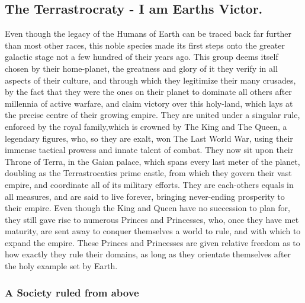 \documentclass[a4paper,12pt]{report}
\begin{document}
\subsection{The Terrastrocraty -  I am Earths Victor.}
Even though the legacy of the Humans of Earth can be traced back far further than most other races, this noble species made its first steps onto the greater galactic stage not a few hundred of their years ago. This group deems itself chosen by their home-planet, the greatness and glory of it they verify in all aspects of their culture, and through which they legitimize their many crusades, by the fact that they were the ones on their planet to dominate all others after millennia of active warfare, and claim victory over this holy-land, which lays at the precise centre of their growing empire. They are united under a singular rule, enforced by the royal family,which is crowned by The King and The Queen, a legendary figures, who, so they are exalt, won The Last World War, using their immense tactical prowess and innate talent of combat. They now sit upon their Throne of Terra, in the Gaian palace, which spans every last meter of the planet, doubling as the Terrastrocaties prime castle, from which they govern their vast empire, and coordinate all of its military efforts. They are each-others equals in all  measures, and are said to live forever, bringing never-ending prosperity to their empire. Even though the King and Queen have no succession to plan for, they still gave rise to numerous Princes and Princesses, who, once they have met maturity, are sent away to conquer themselves a world to rule, and with which to expand the empire. These Princes and Princesses are given relative freedom as to how exactly they rule their domains, as long as they orientate themselves after the holy example set by Earth. \\

\subsubsection*{A Society ruled from above}
\end{document}
